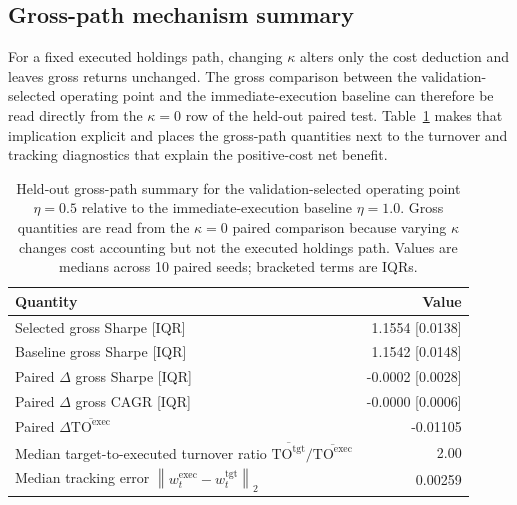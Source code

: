 \documentclass[10pt,twocolumn]{article}
\newcommand{\wexec}{w^{\mathrm{exec}}}
\newcommand{\wtgt}{w^{\mathrm{tgt}}}
\newcommand{\TOexec}{\mathrm{TO}^{\mathrm{exec}}}
\newcommand{\TOtgt}{\mathrm{TO}^{\mathrm{tgt}}}
\newcommand{\normtwo}[1]{\left\lVert #1 \right\rVert_2}
\begin{document}
\subsection{Gross-path mechanism summary}
For a fixed executed holdings path, changing $\kappa$ alters only the cost deduction and leaves gross returns unchanged. The gross comparison between the validation-selected operating point and the immediate-execution baseline can therefore be read directly from the $\kappa=0$ row of the held-out paired test. Table~\ref{tab:gross_path_summary} makes that implication explicit and places the gross-path quantities next to the turnover and tracking diagnostics that explain the positive-cost net benefit.

\begin{table}[H]
\centering
\small
\caption{Held-out gross-path summary for the validation-selected operating point $\eta=0.5$ relative to the immediate-execution baseline $\eta=1.0$. Gross quantities are read from the $\kappa=0$ paired comparison because varying $\kappa$ changes cost accounting but not the executed holdings path. Values are medians across 10 paired seeds; bracketed terms are IQRs.}
\label{tab:gross_path_summary}
\begin{tabular}{@{}p{}r@{}}
\toprule
Quantity & Value \\
\midrule
Selected gross Sharpe [IQR] & 1.1554 [0.0138] \\
Baseline gross Sharpe [IQR] & 1.1542 [0.0148] \\
Paired $\Delta$ gross Sharpe [IQR] & -0.0002 [0.0028] \\
Paired $\Delta$ gross CAGR [IQR] & -0.0000 [0.0006] \\
Paired $\Delta\overline{\TOexec}$ & -0.01105 \\
Median target-to-executed turnover ratio $\overline{\TOtgt}/\overline{\TOexec}$ & 2.00 \\
Median tracking error $\normtwo{\wexec_t-\wtgt_t}$ & 0.00259 \\
\bottomrule
\end{tabular}
\end{table}
\end{document}
